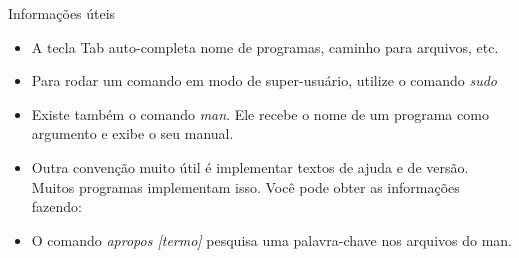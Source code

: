 \documentclass{beamer}
\begin{document}
\begin{frame}{Informações úteis}
  \begin{itemize}
    \item A tecla Tab auto-completa nome de programas, caminho para arquivos,
      etc.
  \item Para rodar um comando em modo de super-usuário, utilize o comando
    \emph{sudo}
  \item Existe também o comando \emph{man}. Ele recebe o nome de um programa
    como argumento e exibe o seu manual.
  \item Outra convenção muito útil é implementar textos de ajuda e de versão.
    Muitos programas implementam isso. Você pode obter as informações fazendo:
  \item O comando \emph{apropos [termo]} pesquisa uma palavra-chave nos arquivos
    do man.
  \end{itemize}
  \begin{center}
    \begin{shell}
      \\
      \\
      \\
    \end{shell}
  \end{center}
\end{frame}

\begin{frame}
  \begin{center}
    \begin{shell}
      \\
      \\
      \\
      \\
      \\
    \end{shell}
  \end{center}
\end{frame}
\end{document}

